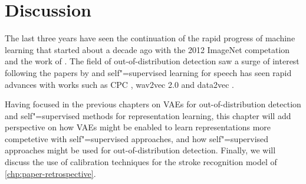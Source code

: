 
\chapter[discussion]{Discussion}\label{chp:discussion}
%


The last three years have seen the continuation of the rapid progress of machine learning that started about a decade ago with the 2012 ImageNet competation and the work of \textcite{krizhevsky_imagenet_2012}. The field of out-of-distribution detection saw a surge of interest following the papers by \textcite{choi_waic_2019,nalisnick_detecting_2019,hendrycks_deep_2019} and self"=supervised learning for speech has seen rapid advances with works such as CPC \parencite{oord_representation_2018}, wav2vec 2.0 \parencite{baevski_wav2vec_2020} and data2vec \parencite{baevski_data2vec_2022}. 

Having focused in the previous chapters on VAEs for out-of-distribution detection and self"=supervised methods for representation learning, this chapter will add perspective on how VAEs might be enabled to learn representations more competetive with self"=supervised approaches, and how self"=supervised approaches might be used for out-of-distribution detection. 
Finally, we will discuss the use of calibration techniques for the stroke recognition model of \cref{chp:paper-retrospective}.

% 


